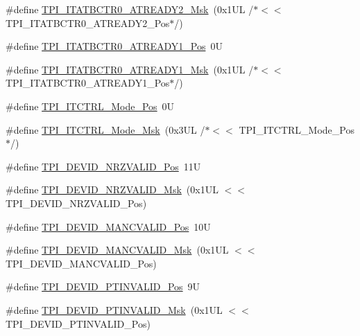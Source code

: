 \begin{DoxyCompactItemize}
\#define \hyperlink{group___c_m_s_i_s___t_p_i_gaf985067de6e6e68fbbd2350646b9125e}{T\+P\+I\+\_\+\+I\+T\+A\+T\+B\+C\+T\+R0\+\_\+\+A\+T\+R\+E\+A\+D\+Y2\+\_\+\+Msk}~(0x1\+U\+L /$\ast$$<$$<$ T\+P\+I\+\_\+\+I\+T\+A\+T\+B\+C\+T\+R0\+\_\+\+A\+T\+R\+E\+A\+D\+Y2\+\_\+\+Pos$\ast$/)
\item 
\#define \hyperlink{group___c_m_s_i_s___t_p_i_gaded82241155665db59493d912d44c65c}{T\+P\+I\+\_\+\+I\+T\+A\+T\+B\+C\+T\+R0\+\_\+\+A\+T\+R\+E\+A\+D\+Y1\+\_\+\+Pos}~0U
\item 
\#define \hyperlink{group___c_m_s_i_s___t_p_i_ga21e1f9c5532e75ee2edc8eb4cf69b1f0}{T\+P\+I\+\_\+\+I\+T\+A\+T\+B\+C\+T\+R0\+\_\+\+A\+T\+R\+E\+A\+D\+Y1\+\_\+\+Msk}~(0x1\+U\+L /$\ast$$<$$<$ T\+P\+I\+\_\+\+I\+T\+A\+T\+B\+C\+T\+R0\+\_\+\+A\+T\+R\+E\+A\+D\+Y1\+\_\+\+Pos$\ast$/)
\item 
\#define \hyperlink{group___c_m_s_i_s___t_p_i_gaa847adb71a1bc811d2e3190528f495f0}{T\+P\+I\+\_\+\+I\+T\+C\+T\+R\+L\+\_\+\+Mode\+\_\+\+Pos}~0U
\item 
\#define \hyperlink{group___c_m_s_i_s___t_p_i_gad6f87550b468ad0920d5f405bfd3f017}{T\+P\+I\+\_\+\+I\+T\+C\+T\+R\+L\+\_\+\+Mode\+\_\+\+Msk}~(0x3\+U\+L /$\ast$$<$$<$ T\+P\+I\+\_\+\+I\+T\+C\+T\+R\+L\+\_\+\+Mode\+\_\+\+Pos$\ast$/)
\item 
\#define \hyperlink{group___c_m_s_i_s___t_p_i_ga9f46cf1a1708575f56d6b827766277f4}{T\+P\+I\+\_\+\+D\+E\+V\+I\+D\+\_\+\+N\+R\+Z\+V\+A\+L\+I\+D\+\_\+\+Pos}~11U
\item 
\#define \hyperlink{group___c_m_s_i_s___t_p_i_gacecc8710a8f6a23a7d1d4f5674daf02a}{T\+P\+I\+\_\+\+D\+E\+V\+I\+D\+\_\+\+N\+R\+Z\+V\+A\+L\+I\+D\+\_\+\+Msk}~(0x1\+U\+L $<$$<$ T\+P\+I\+\_\+\+D\+E\+V\+I\+D\+\_\+\+N\+R\+Z\+V\+A\+L\+I\+D\+\_\+\+Pos)
\item 
\#define \hyperlink{group___c_m_s_i_s___t_p_i_ga675534579d9e25477bb38970e3ef973c}{T\+P\+I\+\_\+\+D\+E\+V\+I\+D\+\_\+\+M\+A\+N\+C\+V\+A\+L\+I\+D\+\_\+\+Pos}~10U
\item 
\#define \hyperlink{group___c_m_s_i_s___t_p_i_ga4c3ee4b1a34ad1960a6b2d6e7e0ff942}{T\+P\+I\+\_\+\+D\+E\+V\+I\+D\+\_\+\+M\+A\+N\+C\+V\+A\+L\+I\+D\+\_\+\+Msk}~(0x1\+U\+L $<$$<$ T\+P\+I\+\_\+\+D\+E\+V\+I\+D\+\_\+\+M\+A\+N\+C\+V\+A\+L\+I\+D\+\_\+\+Pos)
\item 
\#define \hyperlink{group___c_m_s_i_s___t_p_i_ga974cccf4c958b4a45cb71c7b5de39b7b}{T\+P\+I\+\_\+\+D\+E\+V\+I\+D\+\_\+\+P\+T\+I\+N\+V\+A\+L\+I\+D\+\_\+\+Pos}~9U
\item 
\#define \hyperlink{group___c_m_s_i_s___t_p_i_ga1ca84d62243e475836bba02516ba6b97}{T\+P\+I\+\_\+\+D\+E\+V\+I\+D\+\_\+\+P\+T\+I\+N\+V\+A\+L\+I\+D\+\_\+\+Msk}~(0x1\+U\+L $<$$<$ T\+P\+I\+\_\+\+D\+E\+V\+I\+D\+\_\+\+P\+T\+I\+N\+V\+A\+L\+I\+D\+\_\+\+Pos)
$$
\end{DoxyCompactItemize}
